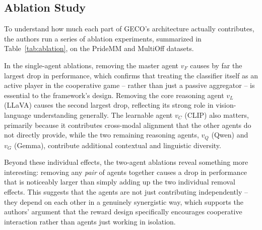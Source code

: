 \documentclass[manuscript,review]{acmart}
\begin{document}
\subsection{Ablation Study}

To understand how much each part of GECO's architecture actually contributes, the authors
run a series of ablation experiments, summarized in Table~\ref{tab:ablation}, on the
PrideMM and MultiOff datasets.

In the single-agent ablations, removing the master agent $v_F$ causes by far the largest
drop in performance, which confirms that treating the classifier itself as an active
player in the cooperative game -- rather than just a passive aggregator -- is essential to
the framework's design. Removing the core reasoning agent $v_L$ (LLaVA) causes the second
largest drop, reflecting its strong role in vision-language understanding generally. The
learnable agent $v_C$ (CLIP) also matters, primarily because it contributes cross-modal
alignment that the other agents do not directly provide, while the two remaining
reasoning agents, $v_Q$ (Qwen) and $v_G$ (Gemma), contribute additional contextual and
linguistic diversity.

Beyond these individual effects, the two-agent ablations reveal something more
interesting: removing any \emph{pair} of agents together causes a drop in performance that
is noticeably larger than simply adding up the two individual removal effects. This
suggests that the agents are not just contributing independently -- they depend on each
other in a genuinely synergistic way, which supports the authors' argument that the
reward design specifically encourages cooperative interaction rather than agents just
working in isolation.
\end{document}
